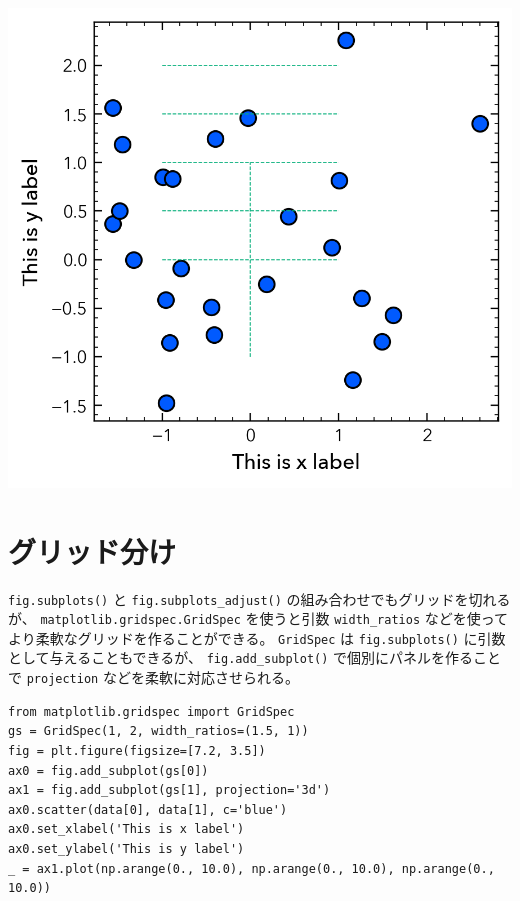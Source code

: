 \documentclass[a4paper, 10pt, notitlepage, twocolumn, uplatex, oneside, dvipdfmx]{jsarticle}
\begin{document}
\begin{center}
\includegraphics[width=1.0\linewidth]{./obipy-resources/params_lines.png}
\end{center}
\section{グリッド分け}
\label{sec:org1d419ec}
\texttt{fig.subplots()} と \texttt{fig.subplots\_adjust()} の組み合わせでもグリッドを切れるが、
\texttt{matplotlib.gridspec.GridSpec} を使うと引数 \texttt{width\_ratios} などを使ってより柔軟なグリッドを作ることができる。
\texttt{GridSpec} は \texttt{fig.subplots()} に引数として与えることもできるが、
\texttt{fig.add\_subplot()} で個別にパネルを作ることで \texttt{projection} などを柔軟に対応させられる。

\begin{verbatim}
from matplotlib.gridspec import GridSpec
gs = GridSpec(1, 2, width_ratios=(1.5, 1))
fig = plt.figure(figsize=[7.2, 3.5])
ax0 = fig.add_subplot(gs[0])
ax1 = fig.add_subplot(gs[1], projection='3d')
ax0.scatter(data[0], data[1], c='blue')
ax0.set_xlabel('This is x label')
ax0.set_ylabel('This is y label')
_ = ax1.plot(np.arange(0., 10.0), np.arange(0., 10.0), np.arange(0., 10.0))
\end{verbatim}
\end{document}
